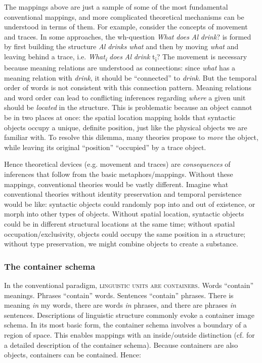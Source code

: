   The mappings above are just a sample of some of the most fundamental conventional mappings, and more complicated theoretical mechanisms can be understood in terms of them. For example, consider the concepts of movement and traces. In some approaches, the wh-question \textit{What} \textit{does} \textit{Al} \textit{drink}? is formed by first building the structure \textit{Al} \textit{drinks} \textit{what} and then by moving \textit{what} and leaving behind a trace, i.e. \textit{What\textsubscript{i}} \textit{does} \textit{Al} \textit{drink} t\textsubscript{i}? The movement is necessary because meaning relations are understood as connections: since \textit{what} has a meaning relation with \textit{drink}, it should be “connected” to \textit{drink}. But the temporal order of words is not consistent with this connection pattern. Meaning relations and word order can lead to conflicting inferences regarding \textit{where} a given unit should be \textit{located} in the structure. This is problematic because an object cannot be in two places at once: the spatial location mapping holds that syntactic objects occupy a unique, definite position, just like the physical objects we are familiar with. To resolve this dilemma, many theories propose to \textit{move} the object, while leaving its original “position” “occupied” by a trace object.

  Hence theoretical devices (e.g. movement and traces) are \textit{consequences} of inferences that follow from the basic metaphors/mappings. Without these mappings, conventional theories would be vastly different. Imagine what conventional theories without identity preservation and temporal persistence would be like: syntactic objects could randomly pop into and out of existence, or morph into other types of objects. Without spatial location, syntactic objects could be in different structural locations at the same time; without spatial occupation/exclusivity, objects could occupy the same position in a structure; without type preservation, we might combine objects to create a substance.

\subsubsection{The container schema} 

In the conventional paradigm, \textsc{linguistic} \textsc{units} \textsc{are} \textsc{containers}. Words “contain” meanings. Phrases “contain” words. Sentences “contain” phrases. There is meaning \textit{in} my words, there are words \textit{in} phrases, and there are phrases \textit{in} sentences. Descriptions of linguistic structure commonly evoke a container image schema. In its most basic form, the container schema involves a boundary of a region of space. This enables mappings with an inside/outside distinction (cf. \citet{LakoffNúñez2000} for a detailed description of the container schema). Because containers are also objects, containers can be contained. Hence:

